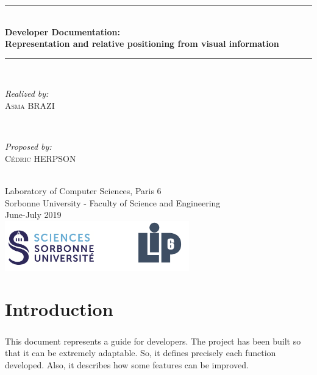 \documentclass[12pt]{report}
\begin{document}
\begin{titlepage}

\newcommand{\HRule}{\rule{\linewidth}{0.5mm}} %

\center 

\HRule \\[0.4cm]
{ \huge \bfseries Developer Documentation: \\Representation and relative positioning from visual information}\\[0.4cm]
\HRule \\[1.5cm]

\begin{minipage}{0.4\textwidth}
	\begin{flushleft} \large
		\emph{Realized by:}\\
		\textsc{Asma BRAZI}
	\end{flushleft}
\end{minipage}
~
\begin{minipage}{0.4\textwidth}
	\begin{flushright} \large
		\emph{Proposed by:} \\
		\textsc{Cédric HERPSON}\\
	\end{flushright}
\end{minipage}\\[4cm]


{\large Laboratory of Computer Sciences, Paris 6 \\ Sorbonne University - Faculty of Science and Engineering}\\[3cm] 
{\large June-July 2019 }\\[3cm] 
\includegraphics[width=0.6\textwidth]{logo.png}\\[1cm] 
\vfill %

\end{titlepage}
\tableofcontents

\chapter{Introduction}
\paragraph{}
This document represents a guide for developers. The project has been built so that it can be extremely adaptable. So, it defines precisely each function developed. Also, it describes how some features can be improved.
\end{document}
